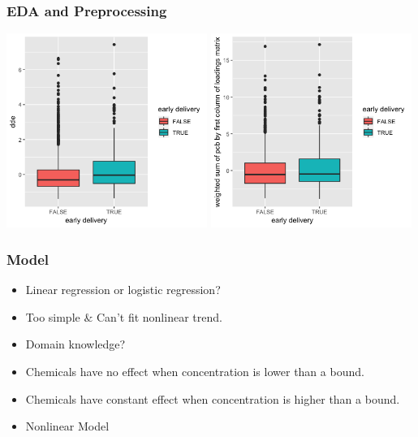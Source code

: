\documentclass{beamer}
\begin{document}
\begin{frame}
    \frametitle{EDA and Preprocessing}

    
    \includegraphics[width=0.49\textwidth]{ddeVSearly.png}
    \includegraphics[width=0.49\textwidth]{pcbVSearly.png}
    
        
\end{frame}



\begin{frame}
\frametitle{Model}


\begin{itemize}
\item Linear regression or logistic regression?
\pause
\item Too simple $\&$ Can't fit nonlinear trend.
\pause
\item Domain knowledge?
\pause
\item Chemicals have no effect when concentration is lower than a bound.
\pause
\item Chemicals have constant effect when concentration is higher than a bound.
\pause
\item Nonlinear Model
\end{itemize}
\end{frame}
\end{document}
